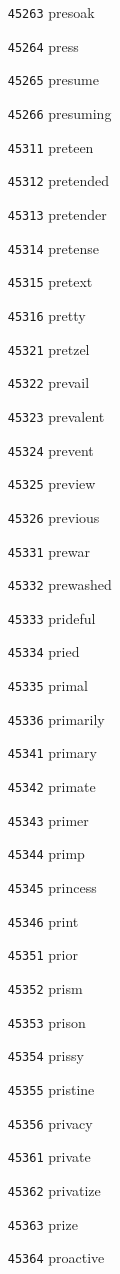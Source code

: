 \documentclass[twoside,11pt]{article}
\begin{document}
\begin{multicols}{5}
\begin{enumerate}
\item[\texttt{45263}] presoak
\item[\texttt{45264}] press
\item[\texttt{45265}] presume
\item[\texttt{45266}] presuming
\item[\texttt{45311}] preteen
\item[\texttt{45312}] pretended
\item[\texttt{45313}] pretender
\item[\texttt{45314}] pretense
\item[\texttt{45315}] pretext
\item[\texttt{45316}] pretty
\item[\texttt{45321}] pretzel
\item[\texttt{45322}] prevail
\item[\texttt{45323}] prevalent
\item[\texttt{45324}] prevent
\item[\texttt{45325}] preview
\item[\texttt{45326}] previous
\item[\texttt{45331}] prewar
\item[\texttt{45332}] prewashed
\item[\texttt{45333}] prideful
\item[\texttt{45334}] pried
\item[\texttt{45335}] primal
\item[\texttt{45336}] primarily
\item[\texttt{45341}] primary
\item[\texttt{45342}] primate
\item[\texttt{45343}] primer
\item[\texttt{45344}] primp
\item[\texttt{45345}] princess
\item[\texttt{45346}] print
\item[\texttt{45351}] prior
\item[\texttt{45352}] prism
\item[\texttt{45353}] prison
\item[\texttt{45354}] prissy
\item[\texttt{45355}] pristine
\item[\texttt{45356}] privacy
\item[\texttt{45361}] private
\item[\texttt{45362}] privatize
\item[\texttt{45363}] prize
\item[\texttt{45364}] proactive

\end{enumerate}
\end{multicols}
\end{document}
